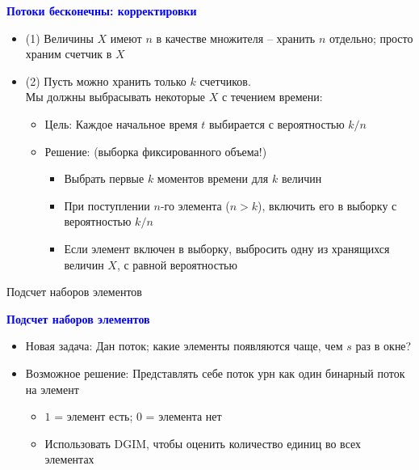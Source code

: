\documentclass[landscape]{slides}
\begin{document}
\begin{normalsize}
\begin{slide}
\textbf{\textcolor{blue}{Потоки бесконечны: корректировки}}

\begin{itemize}
\item (1) Величины $X$ имеют $n$ в качестве множителя -- хранить $n$ отдельно; просто храним счетчик в $X$
\item (2) Пусть можно хранить только $k$ счетчиков.\\
Мы должны выбрасывать некоторые $X$ с течением времени:
  \begin{itemize}
  \item Цель: Каждое начальное время $t$ выбирается с вероятностью $k/n$
  \item Решение: (выборка фиксированного объема!)
    \begin{itemize}
    \item Выбрать первые $k$ моментов времени для $k$ величин
    \item При поступлении $n$-го элемента ($n>k$), включить его в выборку с вероятностью $k/n$
    \item Если элемент включен в выборку, выбросить одну из хранящихся величин $X$, с равной вероятностью
    \end{itemize}
  \end{itemize}
\end{itemize}
\end{slide}


\begin{slide}
Подсчет наборов элементов
\end{slide}



\begin{slide}
\textbf{\textcolor{blue}{Подсчет наборов элементов}}

\begin{itemize}
\item Новая задача: Дан поток; какие элементы появляются чаще, чем $s$ раз в окне?
\item Возможное решение: Представлять себе поток урн как один бинарный поток на элемент
  \begin{itemize}
  \item $1$ = элемент есть; $0$ = элемента нет
  \item Использовать DGIM, чтобы оценить количество единиц во всех элементах
  \end{itemize}
\end{itemize}
\end{slide}



\end{normalsize}
\end{document}
